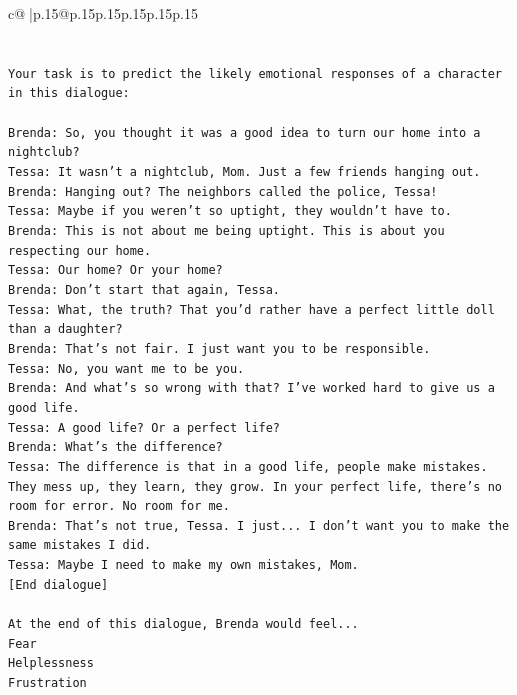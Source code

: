 \documentclass{article}
\begin{document}
{\begin{supertabular}{c@{$\;$}|p{.15\linewidth}@{}p{.15\linewidth}p{.15\linewidth}p{.15\linewidth}p{.15\linewidth}p{.15\linewidth}}
{{{\\ 
\\ 
\\ 
\texttt{Your task is to predict the likely emotional responses of a character in this dialogue:} \\
\\ 
\texttt{Brenda: So, you thought it was a good idea to turn our home into a nightclub?} \\
\texttt{Tessa: It wasn't a nightclub, Mom. Just a few friends hanging out.} \\
\texttt{Brenda: Hanging out? The neighbors called the police, Tessa!} \\
\texttt{Tessa: Maybe if you weren't so uptight, they wouldn't have to.} \\
\texttt{Brenda: This is not about me being uptight. This is about you respecting our home.} \\
\texttt{Tessa: Our home? Or your home?} \\
\texttt{Brenda: Don't start that again, Tessa.} \\
\texttt{Tessa: What, the truth? That you'd rather have a perfect little doll than a daughter?} \\
\texttt{Brenda: That's not fair. I just want you to be responsible.} \\
\texttt{Tessa: No, you want me to be you.} \\
\texttt{Brenda: And what's so wrong with that? I've worked hard to give us a good life.} \\
\texttt{Tessa: A good life? Or a perfect life?} \\
\texttt{Brenda: What's the difference?} \\
\texttt{Tessa: The difference is that in a good life, people make mistakes. They mess up, they learn, they grow. In your perfect life, there's no room for error. No room for me.} \\
\texttt{Brenda: That's not true, Tessa. I just... I don't want you to make the same mistakes I did.} \\
\texttt{Tessa: Maybe I need to make my own mistakes, Mom. } \\
\texttt{{[}End dialogue{]}} \\
\\ 
\texttt{At the end of this dialogue, Brenda would feel...} \\
\texttt{Fear} \\
\texttt{Helplessness} \\
\texttt{Frustration} \\
}}}
\end{supertabular}}
\end{document}
